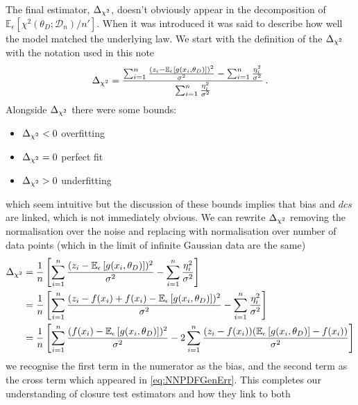 The final estimator, $\Delta_{\chi^{2}}$, doesn't obviously appear in the decomposition of \newline
$\mathbb{E}_{\epsilon}\left[\chi^2(\theta_D; \mathcal{D}_{n})/n'\right]$. 
When it was introduced it was said to describe how well the model matched the
underlying law. We start with the definition of the $\Delta_{\chi^{2}}$ with the notation
used in this note
%
\begin{equation}
        \Delta_{\chi^{2}} = \frac{
            \sum_{i=1}^{n} \frac{(z_i -
            \mathbb{E}_{\epsilon}\left[g(x_i,\theta_D)\right])^2}{\sigma^2} -
            \sum_{i=1}^n \frac{\eta_i^2}{\sigma^2}}{
                \sum_{i=1}^n \frac{\eta_i^2}{\sigma^2}} \, .
\end{equation}
Alongside $\Delta_{\chi^{2}}$ there were some bounds:
%
\begin{itemize}
    \item $\Delta_{\chi^{2}} < 0$ overfitting
    \item $\Delta_{\chi^{2}} = 0$ perfect fit
    \item $\Delta_{\chi^{2}} > 0$ underfitting 
\end{itemize}
%
which seem intuitive but the discussion of these bounds implies that bias and
$dcs$ are linked, which is not immediately obvious. We can rewrite
$\Delta_{\chi^{2}}$ removing the normalisation over the noise and replacing with normalisation
over number of data points (which in the limit of infinite Gaussian data are
the same)
%
\begin{equation}
    \begin{split}
        \Delta_{\chi^{2}} &= \frac{1}{n}\left[ \sum_{i=1}^{n} \frac{(z_i -
        \mathbb{E}_{\epsilon}\left[g(x_i,\theta_D)\right])^2}{\sigma^2} - 
        \sum_{i=1}^n \frac{\eta_i^2}{\sigma^2} \right] \\
        &= \frac{1}{n}\left[ \sum_{i=1}^{n} \frac{(z_i - f(x_i) + f(x_i) -
        \mathbb{E}_{\epsilon}\left[g(x_i,\theta_D)\right])^2}{\sigma^2} - 
        \sum_{i=1}^n \frac{\eta_i^2}{\sigma^2} \right] \\
        &= \frac{1}{n} \left[ \sum_{i=1}^{n} \frac{(f(x_i) -
        \mathbb{E}_{\epsilon}\left[g(x_i,\theta_D)\right])^2}{\sigma^2} - 
        2\sum_{i=1}^n \frac{(z_i - f(x_i))(\mathbb{E}_{\epsilon}\left[g(x_i,\theta_D)\right] - f(x_i))}{\sigma^2}\right]
    \end{split}
    \label{eq: deltachi2tobias}
\end{equation}
%
we recognise the first term in the numerator as the bias, and the second term
as the cross term which appeared in \eqref{eq:NNPDFGenErr}. This completes
our understanding of closure test estimators and how they link to both
